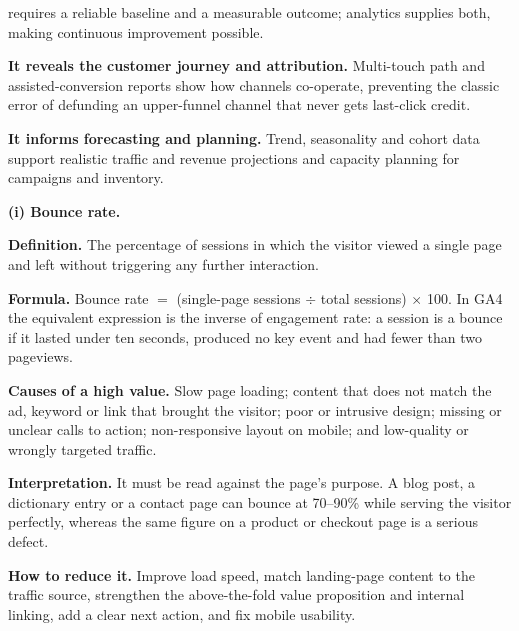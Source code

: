 \begin{qlist}
\begin{apts}
      requires a reliable baseline and a measurable outcome; analytics supplies
      both, making continuous improvement possible.
\item \textbf{It reveals the customer journey and attribution.} Multi-touch
      path and assisted-conversion reports show how channels co-operate,
      preventing the classic error of defunding an upper-funnel channel that
      never gets last-click credit.
\item \textbf{It informs forecasting and planning.} Trend, seasonality and
      cohort data support realistic traffic and revenue projections and
      capacity planning for campaigns and inventory.
\end{apts}

\textbf{(i) Bounce rate.}
\begin{apts}
\item \textbf{Definition.} The percentage of sessions in which the visitor
      viewed a single page and left without triggering any further interaction.
\item \textbf{Formula.} Bounce rate $=$ (single-page sessions $\div$ total
      sessions) $\times$ 100. In GA4 the equivalent expression is the inverse
      of engagement rate: a session is a bounce if it lasted under ten seconds,
      produced no key event and had fewer than two pageviews.
\item \textbf{Causes of a high value.} Slow page loading; content that does not
      match the ad, keyword or link that brought the visitor; poor or intrusive
      design; missing or unclear calls to action; non-responsive layout on
      mobile; and low-quality or wrongly targeted traffic.
\item \textbf{Interpretation.} It must be read against the page's purpose. A
      blog post, a dictionary entry or a contact page can bounce at 70--90\%
      while serving the visitor perfectly, whereas the same figure on a product
      or checkout page is a serious defect.
\item \textbf{How to reduce it.} Improve load speed, match landing-page content
      to the traffic source, strengthen the above-the-fold value proposition
      and internal linking, add a clear next action, and fix mobile usability.
\end{apts}


\end{qlist}
